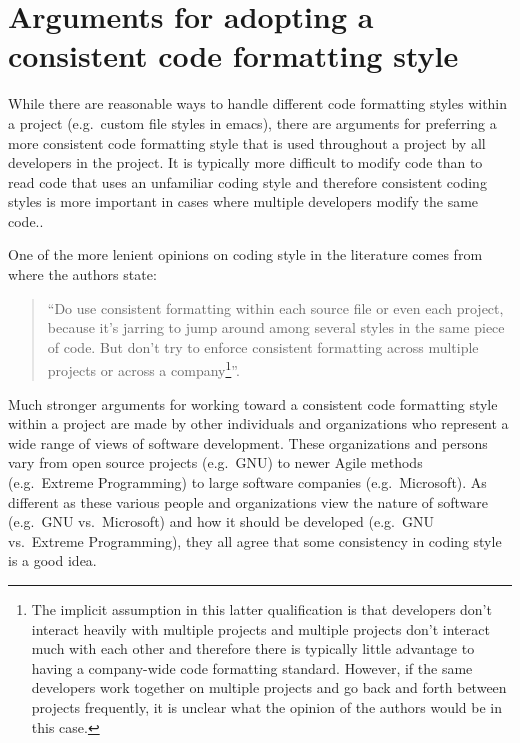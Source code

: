 %
\section{Arguments for adopting a consistent code formatting style}
\label{sec:arguments-for-consistent-style}
%

While there are reasonable ways to handle different code formatting styles
within a project (e.g.\ custom file styles in emacs), there are arguments for
preferring a more consistent code formatting style that is used throughout a
project by all developers in the project.  It is typically more difficult to
modify code than to read code that uses an unfamiliar coding style and
therefore consistent coding styles is more important in cases where multiple
developers modify the same code..

One of the more lenient opinions on coding style in the literature comes from
{}\cite[Item 0]{C++CodingStandards05} where the authors state:

\begin{quote}

``Do use consistent formatting within each source file or even each project,
because it's jarring to jump around among several styles in the same piece of
code.  But don't try to enforce consistent formatting across multiple projects
or across a company\footnote{The implicit assumption in this latter
qualification is that developers don't interact heavily with multiple projects
and multiple projects don't interact much with each other and therefore there
is typically little advantage to having a company-wide code formatting
standard.  However, if the same developers work together on multiple projects
and go back and forth between projects frequently, it is unclear what the
opinion of the authors would be in this case.}''.

\end{quote}

Much stronger arguments for working toward a consistent code formatting style
within a project are made by other individuals and organizations who represent
a wide range of views of software development.  These organizations and
persons vary from open source projects (e.g.\ GNU) to newer Agile methods
(e.g.\ Extreme Programming) to large software companies (e.g.\ Microsoft).  As
different as these various people and organizations view the nature of
software (e.g.\ GNU vs.\ Microsoft) and how it should be developed (e.g.\ GNU
vs.\ Extreme Programming), they all agree that some consistency in coding
style is a good idea.

